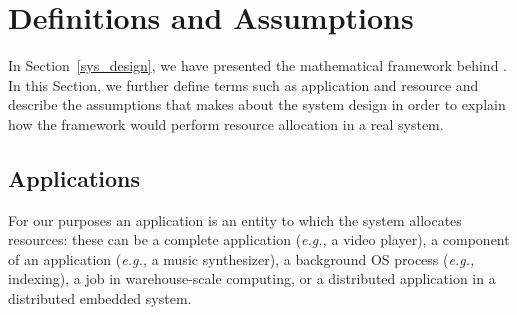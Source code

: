 

\section{Definitions and Assumptions}
In Section~\ref{sys_design}, we have presented the mathematical framework behind \pacora.  In this Section, we further define terms such as application and resource and describe the assumptions that \pacora makes about the system design in order to explain how the framework would perform resource allocation in a real system.


\subsection{Applications}

For our purposes an application is an entity to which the system
allocates resources: these can be a complete application (\emph{e.g.,}
a video player), a component of an application (\emph{e.g.,} a music
synthesizer), a background OS process (\emph{e.g.,} indexing), a job
in warehouse-scale computing, or a distributed application in a
distributed embedded system.

